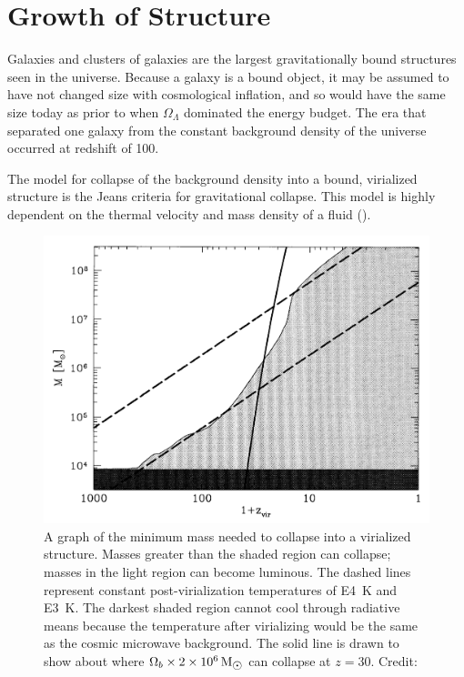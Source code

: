 \documentclass{paper}
\begin{document}
\section{Growth of Structure}

  Galaxies and clusters of galaxies are the largest gravitationally
  bound structures seen in the universe. Because a galaxy is a bound object,
  it may be assumed to have not changed size with cosmological inflation,
  and so would have the same size today as prior to when \(\Omega_{\Lambda}\)
  dominated the energy budget. The era that separated one galaxy from the 
  constant background density of the universe occurred at redshift of 100.

  The model for collapse of the background density into a bound, virialized
  structure is the Jeans criteria for gravitational collapse. This model
  is highly dependent on the thermal velocity and mass density of a fluid
  (\cite{Jeans1902}).

  \begin{figure}[H]
    \begin{centering}
    \includegraphics[scale=0.5]{Struct-mass.pdf}
    \caption{A graph of the minimum mass needed to collapse into a virialized
      structure. Masses greater than the shaded region can collapse; masses in 
      the light region can become luminous. The dashed lines represent 
      constant post-virialization temperatures of \SI{E4}{K} and \SI{E3}{K}. 
      The darkest shaded region cannot cool through radiative means because 
      the temperature after virializing would be the same as the cosmic 
      microwave background. The solid line is drawn to show about where 
      \(\Omega_b \times \SI{2E6}{M_{\astrosun}}\) can collapse at \(z=30\).
    Credit: \cite{1997ApJ...474....1T}}
    \label{fig:Struct-mass}
    \end{centering}
  \end{figure}
\end{document}
